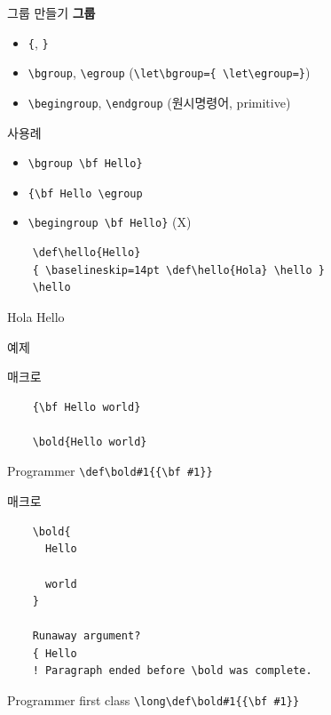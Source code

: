\documentclass{beamer}
\begin{document}
%
\begin{frame}[fragile]{그룹 만들기}
  \textbf{\alert{그룹}}
  \begin{itemize}
  \item \verb+{+, \verb+}+
  \item \verb+\bgroup+, \verb+\egroup+
    ({\small \verb+\let\bgroup={ \let\egroup=}+})
  \item \verb+\begingroup+, \verb+\endgroup+ (원시명령어, primitive)
  \end{itemize}
  \alert{사용례}
  \begin{itemize}
  \item \verb+\bgroup \bf Hello}+
  \item \verb+{\bf Hello \egroup+
  \item \verb+\begingroup \bf Hello}+ (X)
  \end{itemize}
  {\small
\begin{verbatim}
    \def\hello{Hello}
    { \baselineskip=14pt \def\hello{Hola} \hello }
    \hello
\end{verbatim}}
  Hola Hello
\end{frame}


%
\begin{frame}[standout]
  예제
\end{frame}


%
\begin{frame}[fragile]{\texttt{\string\bold} 매크로}
\begin{verbatim}
    {\bf Hello world}
    
    \bold{Hello world}
\end{verbatim}
  \begin{alertblock}{Programmer}
    \verb+\def\bold#1{{\bf #1}}+
  \end{alertblock}
\end{frame}


%
\begin{frame}[fragile]{\texttt{\string\bold} 매크로}
\begin{verbatim}
    \bold{
      Hello

      world
    }

    Runaway argument?
    { Hello
    ! Paragraph ended before \bold was complete.
\end{verbatim}
  \begin{alertblock}{Programmer first class}
    \verb+\long\def\bold#1{{\bf #1}}+
  \end{alertblock}
\end{frame}
\end{document}
